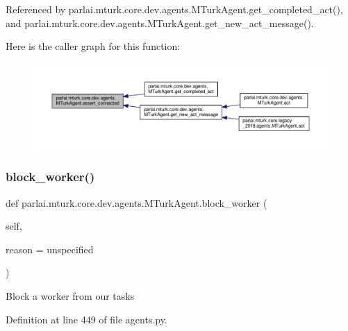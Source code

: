 Referenced by parlai.\+mturk.\+core.\+dev.\+agents.\+M\+Turk\+Agent.\+get\+\_\+completed\+\_\+act(), and parlai.\+mturk.\+core.\+dev.\+agents.\+M\+Turk\+Agent.\+get\+\_\+new\+\_\+act\+\_\+message().

Here is the caller graph for this function\+:
\nopagebreak
\begin{figure}[H]
\begin{center}
\leavevmode
\includegraphics[width=350pt]{classparlai_1_1mturk_1_1core_1_1dev_1_1agents_1_1MTurkAgent_a9761bfc34d22aae02017a258276dfaa8_icgraph}
\end{center}
\end{figure}
\mbox{\label{classparlai_1_1mturk_1_1core_1_1dev_1_1agents_1_1MTurkAgent_a9c489d23ae16a931ef3945752e9fe359}} 
\subsubsection{\texorpdfstring{block\+\_\+worker()}{block\_worker()}}
{\footnotesize\ttfamily def parlai.\+mturk.\+core.\+dev.\+agents.\+M\+Turk\+Agent.\+block\+\_\+worker (\begin{DoxyParamCaption}\item[{}]{self,  }\item[{}]{reason = {\ttfamily \textquotesingle{}unspecified\textquotesingle{}} }\end{DoxyParamCaption})}

\begin{DoxyVerb}Block a worker from our tasks\end{DoxyVerb}
 

Definition at line 449 of file agents.\+py.




